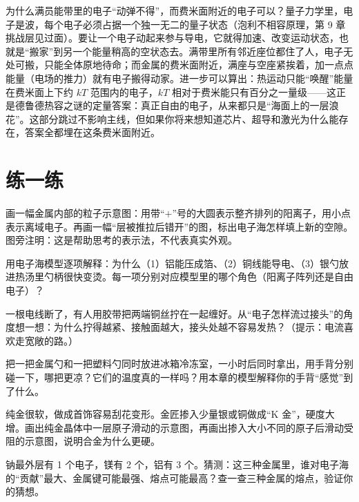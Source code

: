 \begin{tiaozhan}
为什么满员能带里的电子“动弹不得”，而费米面附近的电子可以？量子力学里，电子是波，每个电子必须占据一个独一无二的量子状态（泡利不相容原理，第 9 章挑战层见过面）。要让一个电子动起来参与导电，它就得加速、改变运动状态，也就是“搬家”到另一个能量稍高的空状态去。满带里所有邻近座位都住了人，电子无处可搬，只能全体原地待命；而金属的费米面附近，满座与空座紧挨着，加一点点能量（电场的推力）就有电子搬得动家。进一步可以算出：热运动只能“唤醒”能量在费米面上下约 $kT$ 范围内的电子，$kT$ 相对于费米能只有百分之一量级——这正是德鲁德热容之谜的定量答案：真正自由的电子，从来都只是“海面上的一层浪花”。这部分跳过不影响主线，但如果你将来想知道芯片、超导和激光为什么能存在，答案全都埋在这条费米面附近。
\end{tiaozhan}

\section*{练一练}

\begin{sikaoti}
\item 画一幅金属内部的粒子示意图：用带“$+$”号的大圆表示整齐排列的阳离子，用小点表示离域电子。再画一幅“层被推拉后错开”的图，标出电子海怎样填上新的空隙。图旁注明：这是帮助思考的表示法，不代表真实外观。
\item 用电子海模型逐项解释：为什么（1）铝能压成箔、（2）铜线能导电、（3）银勺放进热汤里勺柄很快变烫。每一项分别对应模型里的哪个角色（阳离子阵列还是自由电子）？
\item 一根电线断了，有人用胶带把两端铜丝拧在一起缠好。从“电子怎样流过接头”的角度想一想：为什么拧得越紧、接触面越大，接头处越不容易发热？（提示：电流喜欢走宽敞的路。）
\item 把一把金属勺和一把塑料勺同时放进冰箱冷冻室，一小时后同时拿出，用手背分别碰一下，哪把更凉？它们的温度真的一样吗？用本章的模型解释你的手背“感觉”到了什么。
\item 纯金很软，做成首饰容易刮花变形。金匠掺入少量银或铜做成“K 金”，硬度大增。画出纯金晶体中一层原子滑动的示意图，再画出掺入大小不同的原子后滑动受阻的示意图，说明合金为什么更硬。
\item 钠最外层有 1 个电子，镁有 2 个，铝有 3 个。猜测：这三种金属里，谁对电子海的“贡献”最大、金属键可能最强、熔点可能最高？查一查三种金属的熔点，验证你的猜想。
\end{sikaoti}
